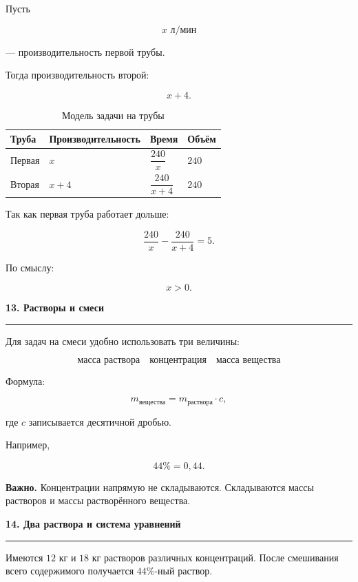 \documentclass[a4paper,12pt]{article}
\newcommand{\topic}[1]{%
    \vspace{0.5em}
    {\Large\bfseries\textcolor{darkaccent}{#1}}\par
    \vspace{0.2em}
    {\color{accent}\rule{\linewidth}{0.7pt}}
    \vspace{0.5em}
}
\newcommand{\warning}[1]{%
    \par\smallskip
    \textbf{\textcolor{accent}{Важно.}} #1
    \par\smallskip
}
\begin{document}
Пусть

\[
x\text{ л/мин}
\]

--- производительность первой трубы.

Тогда производительность второй:

\[
x+4.
\]

\begin{table}[h]
\centering
\caption{Модель задачи на трубы}
\renewcommand{\arraystretch}{1.4}
\begin{tabularx}{0.9\linewidth}{@{}lXXX@{}}
\toprule
Труба & Производительность & Время & Объём \\
\midrule
Первая & \(x\) & \(\dfrac{240}{x}\) & \(240\) \\
Вторая & \(x+4\) & \(\dfrac{240}{x+4}\) & \(240\) \\
\bottomrule
\end{tabularx}
\end{table}

Так как первая труба работает дольше:

\[
\frac{240}{x}
-
\frac{240}{x+4}
=5.
\]

По смыслу:

\[
x>0.
\]


\topic{13. Растворы и смеси}

Для задач на смеси удобно использовать три величины:

\[
\boxed{
\text{масса раствора}
\quad
\text{концентрация}
\quad
\text{масса вещества}
}
\]

Формула:

\[
m_{\text{вещества}}
=
m_{\text{раствора}}\cdot c,
\]

где \(c\) записывается десятичной дробью.

Например,

\[
44\%=0{,}44.
\]

\warning{
Концентрации напрямую не складываются. Складываются массы растворов и массы растворённого вещества.
}


\topic{14. Два раствора и система уравнений}

Имеются \(12\) кг и \(18\) кг растворов различных концентраций. После смешивания всего содержимого получается \(44\%\)-ный раствор.
\end{document}
